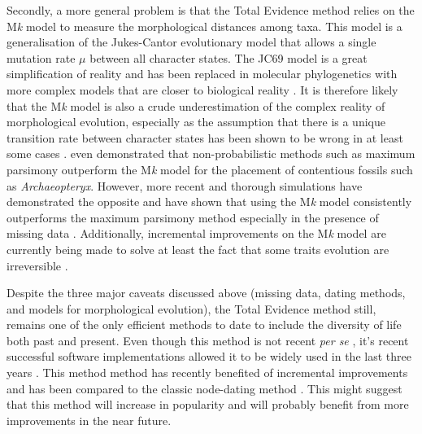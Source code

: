 Secondly, a more general problem is that the Total Evidence method relies on the M\textit{k} model \citep{lewisa2001} to measure the morphological distances among taxa. %
This model is a generalisation of the Jukes-Cantor evolutionary model \citep[JC69;][]{jukes1969evolution} that allows a single mutation rate $\mu$ between all character states.
The JC69 model is a great simplification of reality and has been replaced in molecular phylogenetics with more complex models that are closer to biological reality \citep[e.g. the GTR model that allows a different rate for each different type of nucleotide change;][]{tavare1986}.
It is therefore likely that the M\textit{k} model is also a crude underestimation of the complex reality of morphological evolution, especially as the assumption that there is a unique transition rate between character states has been shown to be wrong in at least some cases \citep[e.g. for Dollo traits that are irreversible;][]{WrightDollo}.
\cite{spencerefficacy2013} even demonstrated that non-probabilistic methods such as maximum parsimony outperform the M\textit{k} model for the placement of contentious fossils such as \textit{Archaeopteryx}.
However, more recent and thorough simulations have demonstrated the opposite and have shown that using the M\textit{k} model consistently outperforms the maximum parsimony method %
especially in the presence of missing data \citep{wrightbayesian2014}.
Additionally, incremental improvements on the M\textit{k} model are currently being made to solve at least the fact that some traits evolution are irreversible \citep[][and personal communications]{Klopfstein12082015}.

Despite the three major caveats discussed above (missing data, dating methods, and models for morphological evolution), the Total Evidence method still, remains one of the only efficient methods to date to include the diversity of life both past and present.
Even though this method is not recent \textit{per se} \citep[e.g.][]{eernissetaxonomic1993}, it's recent successful software implementations \citep{Ronquist2012mrbayes,BEAST2} allowed it to be widely used in the last three years \citep{ronquista2012,Slater2012MEE,Wood01032013,schragocombining2013,beckancient2014,Arcila2015131,Dembo2015,Klopfstein12082015,Carrizo,Wittenberg2015TEM,gavryushkina2015bayesian}.
This method method has recently benefited of incremental improvements \citep{Klopfstein12082015,gavryushkina2015bayesian} and has been compared to the classic node-dating method \citep{ronquista2012,Arcila2015131}.
This might suggest that this method will increase in popularity and will probably benefit from more improvements in the near future.

